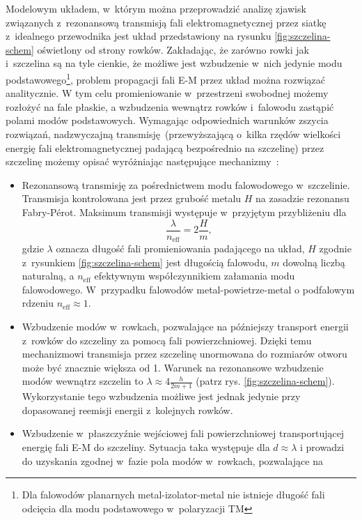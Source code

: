 Modelowym układem, w~którym można przeprowadzić analizę zjawisk związanych z~rezonansową transmisją fali elektromagnetycznej przez siatkę z~idealnego przewodnika jest układ przedstawiony na rysunku \ref{fig:szczelina-schem} oświetlony od strony rowków. Zakładając, że zarówno rowki jak i~szczelina są na tyle cienkie, że możliwe jest wzbudzenie w~nich jedynie modu podstawowego\footnote{Dla falowodów planarnych metal-izolator-metal nie istnieje długość fali odcięcia dla modu podstawowego w~polaryzacji TM}, problem propagacji fali E-M przez układ można rozwiązać analitycznie. W tym celu promieniowanie w~przestrzeni swobodnej możemy rozłożyć na fale płaskie, a wzbudzenia wewnątrz rowków i~falowodu zastąpić polami modów podstawowych. Wymagając odpowiednich warunków zszycia rozwiązań, nadzwyczajną transmisję~(przewyższającą o~kilka rzędów wielkości energię fali elektromagnetycznej padającą bezpośrednio na szczelinę) przez szczelinę możemy opisać wyróżniając następujące mechanizmy~\cite{martin2001theory}:
\begin{itemize}
	\item Rezonansową transmisję za pośrednictwem modu falowodowego w~szczelinie. Transmisja kontrolowana jest przez grubość metalu $H$ na zasadzie rezonansu Fabry-P\'{e}rot. Maksimum transmisji występuje w~przyjętym przybliżeniu dla
\begin{equation}
\frac{\lambda}{n_{\textrm{eff}}} = 2 \frac {H}{m},
\label{eq:fp-szczelina}
\end{equation}
gdzie $\lambda$ oznacza długość fali promieniowania padającego na układ, $H$ zgodnie z~rysunkiem \ref{fig:szczelina-schem} jest długością falowodu, $m$ dowolną liczbą naturalną, a $n_{\textrm{eff}}$ efektywnym współczynnikiem załamania modu falowodowego. W~przypadku falowodów metal-powietrze-metal o podfalowym rdzeniu $n_{\textrm{eff}} \approx 1$.
	\item Wzbudzenie modów w~rowkach, pozwalające na późniejszy transport energii z~rowków do szczeliny za pomocą fali powierzchniowej. Dzięki temu mechanizmowi transmisja przez szczelinę unormowana do rozmiarów otworu może być znacznie większa od 1. Warunek na rezonansowe wzbudzenie modów wewnątrz szczelin to $\lambda \approx 4 \frac {h}{2m+1}$ (patrz rys. \ref{fig:szczelina-schem}). Wykorzystanie tego wzbudzenia możliwe jest jednak jedynie przy dopasowanej reemisji energii z~kolejnych rowków.
	\item  Wzbudzenie w~płaszczyźnie wejściowej fali powierzchniowej transportującej energię fali E-M do szczeliny. Sytuacja taka występuje dla $d \approx \lambda$ i prowadzi do uzyskania zgodnej w~fazie pola modów w~rowkach, pozwalające na
\end{itemize}

